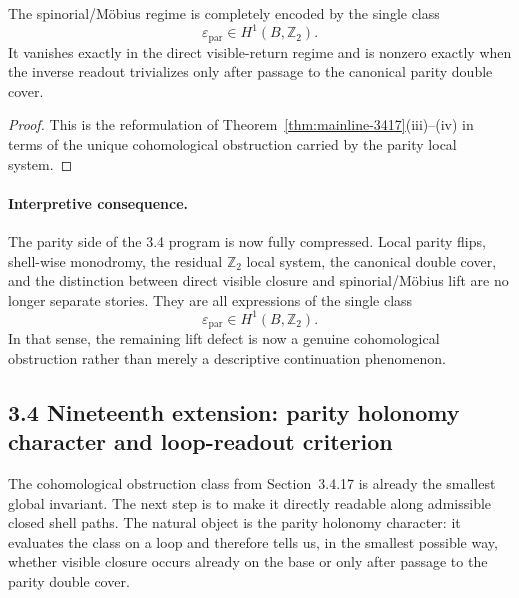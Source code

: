 \begin{corollary}
\label{cor:mainline-3417}
The spinorial/M\"obius regime is completely encoded by the single class
\[
  \varepsilon_{\mathrm{par}}\in H^1(B,\mathbb Z_2).
\]
It vanishes exactly in the direct visible-return regime and is nonzero exactly when the inverse readout trivializes only after passage to the canonical parity double cover.
\end{corollary}

\begin{proof}
This is the reformulation of Theorem~\ref{thm:mainline-3417}(iii)--(iv) in terms of the unique cohomological obstruction carried by the parity local system.
\end{proof}

\paragraph{Interpretive consequence.}
The parity side of the 3.4 program is now fully compressed. Local parity flips, shell-wise monodromy, the residual $\mathbb Z_2$ local system, the canonical double cover, and the distinction between direct visible closure and spinorial/M\"obius lift are no longer separate stories. They are all expressions of the single class
\[
  \varepsilon_{\mathrm{par}}\in H^1(B,\mathbb Z_2).
\]
In that sense, the remaining lift defect is now a genuine cohomological obstruction rather than merely a descriptive continuation phenomenon.


\subsection*{3.4 Nineteenth extension: parity holonomy character and loop-readout criterion}
The cohomological obstruction class from Section~3.4.17 is already the smallest global invariant. The next step is to make it directly readable along admissible closed shell paths. The natural object is the parity holonomy character: it evaluates the class on a loop and therefore tells us, in the smallest possible way, whether visible closure occurs already on the base or only after passage to the parity double cover.

